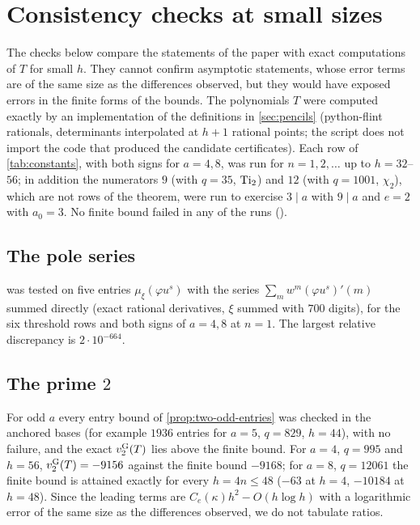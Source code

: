 \section{Consistency checks at small sizes}\label{app:consistency}

The checks below compare the statements of the paper with exact computations of $T$ for small
$h$. They cannot confirm asymptotic statements, whose error terms are of the same size as the
differences observed, but they would have exposed errors in the finite forms of the bounds. The
polynomials $T$ were computed exactly by an implementation of the definitions in
\cref{sec:pencils} (python-flint rationals, determinants interpolated at $h+1$ rational points;
the script does not import the code that produced the candidate certificates). Each row of
\cref{tab:constants}, with both signs for $a=4,8$, was run for $n=1,2,\dots$ up to $h=32$--$56$; in
addition the numerators $9$ (with $q=35$, $\operatorname{Ti}_2$) and $12$ (with $q=1001$, $\chi_2$), which are
not rows of the theorem, were run to exercise $3\mid a$ with $9\mid a$ and $e=2$ with $a_0=3$.
No finite bound failed in any of the runs ().

\subsection{The pole series}
 was tested on five entries $\mu_\xi(\varphi u^s)$ with the series
$\sum_mw^m(\varphi u^s)'(m)$ summed directly (exact rational derivatives, $\xi$ summed with $700$
digits), for the six threshold rows and both signs of $a=4,8$ at $n=1$. The largest relative
discrepancy is $2\cdot10^{-664}$.

\subsection{The prime $2$}
For odd $a$ every entry bound of \cref{prop:two-odd-entries} was checked in the anchored bases
(for example $1936$ entries for $a=5$, $q=829$, $h=44$), with no failure, and the exact
$v_{2}^{\mathrm{G}}(T)$ lies above the finite bound. For $a=4$, $q=995$ and $h=56$, $v_{2}^{\mathrm{G}}(T)=-9156$ against the
finite bound $-9168$; for $a=8$, $q=12061$ the finite bound is attained exactly for every
$h=4n\le48$ ($-63$ at $h=4$, $-10184$ at $h=48$). Since the leading terms are
$C_e(\kappa)h^2-O(h\log h)$ with a logarithmic error of the same size as the differences observed,
we do not tabulate ratios.

